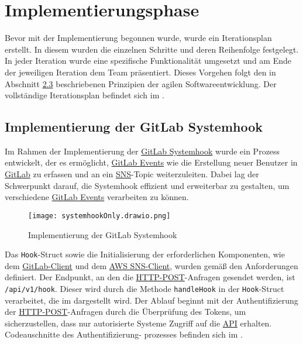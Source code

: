 \section{Implementierungsphase} 
\label{sec:Implementierungsphase}

Bevor mit der Implementierung begonnen wurde, wurde ein Iterationsplan erstellt. In diesem wurden die einzelnen Schritte und deren Reihenfolge festgelegt. In jeder Iteration wurde eine spezifische Funktionalität umgesetzt und am Ende der jeweiligen Iteration dem Team präsentiert. Dieses Vorgehen folgt den in Abschnitt \hyperlink{agil}{2.3} beschriebenen Prinzipien der agilen Softwareentwicklung. Der vollständige Iterationsplan befindet sich im .

\subsection{Implementierung der GitLab Systemhook}
\label{sec:ImplementierungGitlabSystemhook}

Im Rahmen der Implementierung der \hyperlink{GitLab}{\textcolor{AOBlau}{GitLab Systemhook}} wurde ein Prozess entwickelt, der es ermöglicht, \hyperlink{GitLabEvent}{\textcolor{AOBlau}{GitLab Events}} wie die Erstellung neuer Benutzer in \hyperlink{GitLab}{\textcolor{AOBlau}{GitLab}} zu erfassen und an ein \hyperlink{SNS}{\textcolor{AOBlau}{SNS}}-Topic weiterzuleiten. Dabei lag der Schwerpunkt darauf, die Systemhook effizient und erweiterbar zu gestalten, um verschiedene \hyperlink{GitLabEvent}{\textcolor{AOBlau}{GitLab Events}} verarbeiten zu können.

\begin{figure}[htb]
    \centering
    \texttt{[image: systemhookOnly.drawio.png]}
    \caption{Implementierung der GitLab Systemhook}
\end{figure}

Das \texttt{Hook}-Struct sowie die Initialisierung der erforderlichen Komponenten, wie dem \hyperlink{GitLabClient}{\textcolor{AOBlau}{GitLab-Client}} und dem \hyperlink{SNSClient}{\textcolor{AOBlau}{AWS SNS-Client}}, wurden gemäß den Anforderungen definiert. Der Endpunkt, an den die \hyperlink{HTTPPOST}{\textcolor{AOBlau}{HTTP-POST}}-Anfragen gesendet werden, ist \texttt{/api/v1/hook}. Dieser wird durch die Methode \texttt{handleHook} in der \texttt{Hook}-Struct verarbeitet, die im  dargestellt wird. Der Ablauf beginnt mit der Authentifizierung der \hyperlink{HTTP}{\textcolor{AOBlau}{HTTP-POST}}-Anfragen durch die Überprüfung des Tokens, um sicherzustellen, dass nur autorisierte Systeme Zugriff auf die \hyperlink{API}{\textcolor{AOBlau}{API}} erhalten. Codeauschnitte des Authentifizierung- prozesses befinden sich im .

